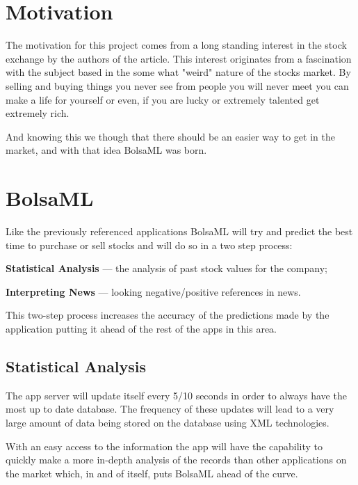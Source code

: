 \documentclass[twocolumn,twoside,11pt,a4paper]{article}
\begin{document}
\section{Motivation}

The motivation for this project comes from a long standing interest in the stock exchange
by the authors of the article. This interest originates from a fascination with the subject
based in the some what "weird" nature of the stocks market. By selling and buying
things you never see from people you will never meet you can make a life for yourself
or even, if you are lucky or extremely talented get extremely rich.

And knowing this we though that there should be an easier way to get in the market, and with that idea BolsaML was born.


\section{BolsaML}\label{sec:application}

Like the previously referenced applications BolsaML will try and predict the
best time to purchase or sell stocks and will do so in a two step process:

\begin{compactitem}
\item \textbf{Statistical Analysis} --- the analysis of past stock values for the company;
\item \textbf{Interpreting News} --- looking negative/positive references in news.
\end{compactitem}

This two-step process increases the accuracy of the predictions made by the application
putting it ahead of the rest of the apps in this area.

\subsection{Statistical Analysis}

The app server will update itself every 5/10 seconds in order to always have the most up to date database.
The frequency of these updates will lead to a very large amount of data being stored on the database using XML technologies.

With an easy access to the information the app will have the capability to quickly make a more in-depth
analysis of the records than other applications on the market which,
in and of itself, puts BolsaML ahead of the curve.
\end{document}
